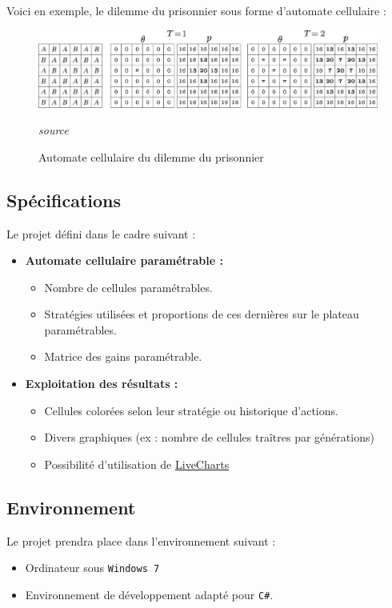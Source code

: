\documentclass[a4paper]{article}
\begin{document}
Voici en exemple, le dilemme du prisonnier sous forme d'automate cellulaire :

\begin{figure}[htp]
    \centering
    \includegraphics[width=\linewidth]{dilemma.png}
    \caption{Automate cellulaire du dilemme du prisonnier} 
    \textit{source} \cite{DilemmaAutomata}
\end{figure}

\pagebreak{}
\subsection{Spécifications}
Le projet défini dans le cadre suivant :

\begin{itemize}
    \item[] \textbf{Automate cellulaire paramétrable :}
    \begin{itemize}
        \item Nombre de cellules paramétrables.
        \item Stratégies utilisées et proportions de ces dernières sur le plateau paramétrables.
        \item Matrice des gains \cite{MatriceGains} paramétrable.
    \end{itemize}
    \item[] \textbf{Exploitation des résultats :}
    \begin{itemize}
        \item Cellules colorées selon leur stratégie ou historique d'actions.
        \item Divers graphiques (ex : nombre de cellules traîtres par générations)
        \item Possibilité d'utilisation de \href{https://lvcharts.net/}{LiveCharts} \cite{LVCharts}
    \end{itemize}
\end{itemize}

\subsection{Environnement}
Le projet prendra place dans l'environnement suivant :
\begin{itemize}
    \item Ordinateur sous \texttt{Windows 7}
    \item Environnement de développement adapté pour \texttt{C\#}.
\end{itemize}
\end{document}
